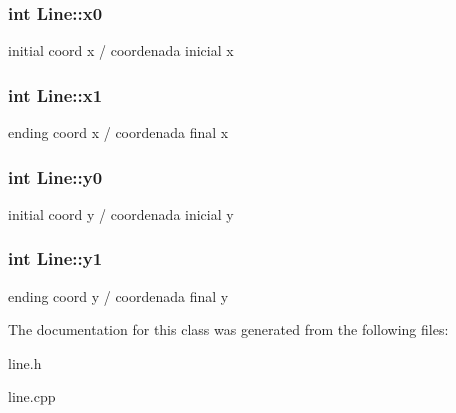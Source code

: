 \subsubsection[{x0}]{\setlength{\rightskip}{0pt plus 5cm}int Line\+::x0\hspace{0.3cm}{\ttfamily [private]}}\label{class_line_a647f6f5c0e2b197e3671f8bdb9ff64a2}
initial coord x / coordenada inicial x \hypertarget{class_line_a1c37aeef714f6c96454c2a9a2dadb69a}{}
\subsubsection[{x1}]{\setlength{\rightskip}{0pt plus 5cm}int Line\+::x1\hspace{0.3cm}{\ttfamily [private]}}\label{class_line_a1c37aeef714f6c96454c2a9a2dadb69a}
ending coord x / coordenada final x \hypertarget{class_line_a8e276229892969c7d82f56581e0c168b}{}
\subsubsection[{y0}]{\setlength{\rightskip}{0pt plus 5cm}int Line\+::y0\hspace{0.3cm}{\ttfamily [private]}}\label{class_line_a8e276229892969c7d82f56581e0c168b}
initial coord y / coordenada inicial y \hypertarget{class_line_a850c96af61bd595a68b5e867540204f1}{}
\subsubsection[{y1}]{\setlength{\rightskip}{0pt plus 5cm}int Line\+::y1\hspace{0.3cm}{\ttfamily [private]}}\label{class_line_a850c96af61bd595a68b5e867540204f1}
ending coord y / coordenada final y 

The documentation for this class was generated from the following files\+:\begin{DoxyCompactItemize}
\item 
line.\+h\item 
line.\+cpp\end{DoxyCompactItemize}
